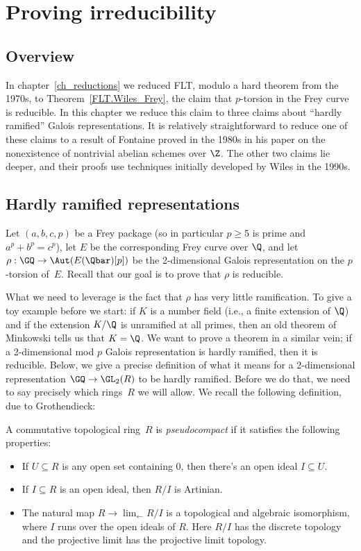 \chapter{Proving irreducibility}\label{ch_freyreduction}

\section{Overview}

In chapter~\ref{ch_reductions} we reduced FLT, modulo a hard theorem from the 1970s,
to Theorem~\ref{FLT.Wiles_Frey}, the claim that $p$-torsion in the Frey
curve is reducible. In this chapter we reduce this claim to three claims
about ``hardly ramified'' Galois representations. It is relatively straightforward
to reduce one of these claims to a result of Fontaine proved in the 1980s in his
paper on the nonexistence of nontrivial abelian schemes over $\Z$. The other two
claims lie deeper, and their proofs use techniques initially developed by Wiles in
the 1990s.

\section{Hardly ramified representations}

Let $(a,b,c,p)$ be a Frey package (so in particular $p\geq5$ is prime and $a^p+b^p=c^p$),
let $E$ be the corresponding Frey curve over $\Q$, and let $\rho:\GQ\to\Aut(E(\Qbar)[p])$
be the 2-dimensional Galois representation on the $p$-torsion of~$E$. Recall that our goal
is to prove that $\rho$ is reducible.

What we need to leverage is the fact that $\rho$ has very little ramification. To give
a toy example before we start: if $K$ is a number field (i.e., a finite extension of $\Q$)
and if the extension $K/\Q$ is unramified at all primes, then an old theorem of
Minkowski tells us that $K=\Q$. We want to prove a theorem in a similar vein; if
a 2-dimensional mod $p$ Galois representation is hardly ramified, then it is reducible.
Below, we give a precise
definition of what it means for a 2-dimensional representation $\GQ\to\GL_2(R)$
to be hardly ramified. Before we do that, we need to say precisely which rings~$R$
we will allow. We recall the following definition, due to Grothendieck:

\begin{definition}
  \label{pseudocompact}
  A commutative topological ring~$R$ is \emph{pseudocompact} if it satisfies
  the following properties:
  \begin{itemize}
    \item If $U\subseteq R$ is any open set containing 0, then there's an open ideal $I\subseteq U$.
    \item If $I\subseteq R$ is an open ideal, then $R/I$ is Artinian.
    \item The natural map $R\to\lim_{\leftarrow} R/I$ is a topological and algebraic isomorphism, where $I$ runs
      over the open ideals of $R$. Here $R/I$ has the discrete topology and the projective
      limit has the projective limit topology.
  \end{itemize}
\end{definition}

